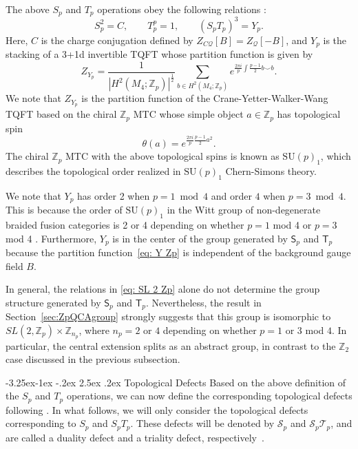\documentclass[aps,twocolumn,prx,floatfix,preprintnumbers, nofootinbib,10pt]{revtex4-2}
\makeatletter
\numberwithin{equation}{section}
\theoremstyle{definition}
\theoremstyle{remark}
\theoremstyle{claim}
\renewcommand\subsubsection{\@startsection{subsubsection}{3}{\z@}%
                                     {-3.25ex\@plus -1ex \@minus -.2ex}%
                                     {2.5ex \@plus .2ex}%
                                     {\centering\itshape\bfseries\small}}
\makeatother
\begin{document}
The above $S_p$ and $T_p$ operations obey the following relations \cite{Choi:2022zal}:
\begin{equation}
S_p^2 = C, \qquad
T_p^p=1, \qquad
(S_pT_p)^3 = Y_p.
\label{eq: SL 2 Zp}
\end{equation}
Here, $C$ is the charge conjugation defined by $Z_{C\mathcal{Q}}[B] = Z_{\mathcal{Q}}[-B]$, and $Y_p$ is the stacking of a 3+1d invertible TQFT whose partition function is given by
\begin{equation}
Z_{Y_p} = \frac{1}{|H^2(M_4; \mathbb{Z}_p)|^{\frac{1}{2}}} \sum_{b \in H^2(M_4; \mathbb{Z}_p)} e^{\frac{2\pi i}{p} \int \frac{p-1}{2} b \smile b}.
\label{eq: Y Zp}
\end{equation}
We note that $Z_{Y_p}$ is the partition function of the Crane-Yetter-Walker-Wang TQFT based on the chiral $\mathbb{Z}_p$ MTC whose simple object $a \in \mathbb{Z}_p$ has topological spin
\begin{equation}
\theta(a) = e^{\frac{2\pi i}{p} \frac{p-1}{2} a^2}.
\end{equation}
The chiral $\mathbb{Z}_p$ MTC with the above topological spins is known as $\mathrm{SU}(p)_1$, which describes the topological order realized in $\mathrm{SU}(p)_1$ Chern-Simons theory.

We note that $Y_p$ has order 2 when $p = 1 \bmod 4$ and order $4$ when $p=3 \bmod 4$.
This is because the order of $\mathrm{SU}(p)_1$ in the Witt group of non-degenerate braided fusion categories is 2 or 4 depending on whether $p=1$ mod 4 or $p=3$ mod 4 \cite{davydov2013witt}.
{Furthermore, $Y_p$ is in the center of the group generated by $\mathsf{S}_p$ and $\mathsf{T}_p$ because the partition function~\eqref{eq: Y Zp} is independent of the background gauge field $B$.}


{In general, the relations in \eqref{eq: SL 2 Zp} alone do not determine the group structure generated by $\mathsf{S}_p$ and $\mathsf{T}_p$. Nevertheless, the result in Section~\ref{sec:ZpQCAgroup} strongly suggests that this group is isomorphic to $SL(2, \mathbb{Z}_p) \times \mathbb{Z}_{n_p}$, where $n_p=2$ or $4$ depending on whether $p=1$ or $3$ mod $4$. In particular, the central extension splits as an abstract group, in contrast to the $\mathbb{Z}_2$ case discussed in the previous subsection.}


\subsubsection{Topological Defects}
Based on the above definition of the $S_p$ and $T_p$ operations, we can now define the corresponding topological defects following \cite{Choi:2021kmx, Choi:2022zal}.
In what follows, we will only consider the topological defects corresponding to $S_p$ and $S_pT_p$.
These defects will be denoted by $\mathcal{S}_p$ and $\mathcal{S}_p\mathcal{T}_p$, and are called a duality defect and a triality defect, respectively~\cite{Choi:2022zal}.
\end{document}
